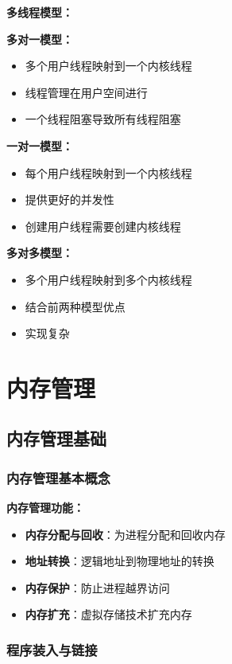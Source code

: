 \documentclass[lang=cn,newtx,10pt,scheme=chinese]{../../elegantbook}
\begin{document}
\textbf{多线程模型：}

\textbf{多对一模型：}
\begin{itemize}
  \item 多个用户线程映射到一个内核线程
  \item 线程管理在用户空间进行
  \item 一个线程阻塞导致所有线程阻塞
\end{itemize}

\textbf{一对一模型：}
\begin{itemize}
  \item 每个用户线程映射到一个内核线程
  \item 提供更好的并发性
  \item 创建用户线程需要创建内核线程
\end{itemize}

\textbf{多对多模型：}
\begin{itemize}
  \item 多个用户线程映射到多个内核线程
  \item 结合前两种模型优点
  \item 实现复杂
\end{itemize}

\chapter{内存管理}

\section{内存管理基础}

\subsection{内存管理基本概念}

\textbf{内存管理功能：}
\begin{itemize}
  \item \textbf{内存分配与回收}：为进程分配和回收内存
  \item \textbf{地址转换}：逻辑地址到物理地址的转换
  \item \textbf{内存保护}：防止进程越界访问
  \item \textbf{内存扩充}：虚拟存储技术扩充内存
\end{itemize}

\subsection{程序装入与链接}
\end{document}
